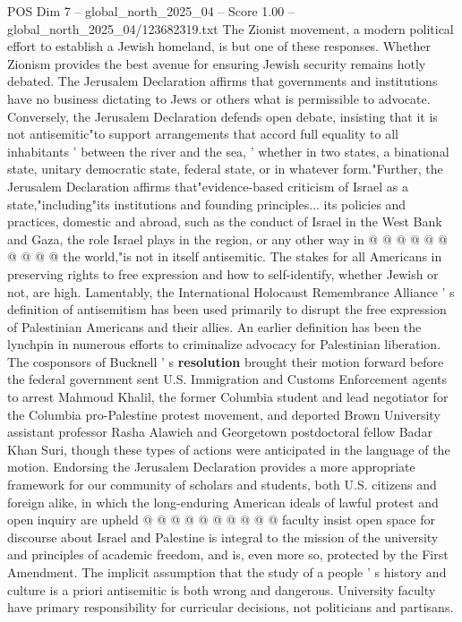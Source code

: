 \begin{textsample}{POS Dim 7 – global\_north\_2025\_04 – Score 1.00 – global\_north\_2025\_04/123682319.txt}
The Zionist movement, a modern political effort to establish a Jewish homeland, is but one of these responses.
Whether Zionism provides the best avenue for ensuring Jewish security remains hotly debated.
The Jerusalem Declaration affirms that governments and institutions have no business dictating to Jews or others what is permissible to advocate.
Conversely, the Jerusalem Declaration defends open debate, insisting that it is not antisemitic"to support arrangements that accord full equality to all inhabitants ' between the river and the sea, ' whether in two states, a binational state, unitary democratic state, federal state, or in whatever form."Further, the Jerusalem Declaration affirms that"evidence-based criticism of Israel as a state,"including"its institutions and founding principles... its policies and practices, domestic and abroad, such as the conduct of Israel in the West Bank and Gaza, the role Israel plays in the region, or any other way in @ @ @ @ @ @ @ @ @ @ the world,"is not in itself antisemitic.
The stakes for all Americans in preserving rights to free expression and how to self-identify, whether Jewish or not, are high.
Lamentably, the International Holocaust Remembrance Alliance ' s definition of antisemitism has been used primarily to disrupt the free expression of Palestinian Americans and their allies.
An earlier definition has been the lynchpin in numerous efforts to criminalize advocacy for Palestinian liberation.
The cosponsors of Bucknell ' s \textbf{resolution} brought their motion forward before the federal government sent U.S.
Immigration and Customs Enforcement agents to arrest Mahmoud Khalil, the former Columbia student and lead negotiator for the Columbia pro-Palestine protest movement, and deported Brown University assistant professor Rasha Alawieh and Georgetown postdoctoral fellow Badar Khan Suri, though these types of actions were anticipated in the language of the motion.
Endorsing the Jerusalem Declaration provides a more appropriate framework for our community of scholars and students, both U.S. citizens and foreign alike, in which the long-enduring American ideals of lawful protest and open inquiry are upheld @ @ @ @ @ @ @ @ @ @ faculty insist open space for discourse about Israel and Palestine is integral to the mission of the university and principles of academic freedom, and is, even more so, protected by the First Amendment.
The implicit assumption that the study of a people ' s history and culture is a priori antisemitic is both wrong and dangerous.
University faculty have primary responsibility for curricular decisions, not politicians and partisans.

\end{textsample}
